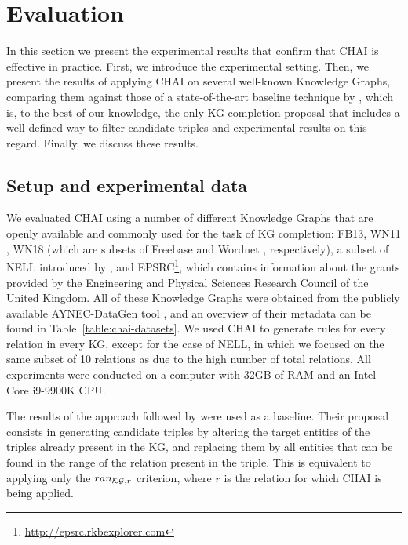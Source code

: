 \section{Evaluation}\label{sec:chai-evaluation}
In this section we present the experimental results that confirm that CHAI is effective in practice. First, we introduce the experimental setting. Then, we present the results of applying CHAI on several well-known Knowledge Graphs, comparing them against those of a state-of-the-art baseline technique by \citet{shi18}, which is, to the best of our knowledge, the only KG completion proposal that includes a well-defined way to filter candidate triples and experimental results on this regard. Finally, we discuss these results.

\subsection{Setup and experimental data}

We evaluated CHAI using a number of different Knowledge Graphs that are openly available and commonly used for the task of KG completion: FB13, WN11 \cite{socher2013}, WN18 \cite{bordes2014} (which are subsets of Freebase \cite{bollacker2008} and Wordnet \cite{miller1995}, respectively), a subset of NELL introduced by \citet{gardner2015}, and EPSRC\footnote{\url{http://epsrc.rkbexplorer.com}}, which contains information about the grants provided by the Engineering and Physical Sciences Research Council of the United Kingdom. All of these Knowledge Graphs were obtained from the publicly available AYNEC-DataGen tool \cite{ayala2019}, and an overview of their metadata can be found in Table~\ref{table:chai-datasets}. We used CHAI to generate rules for every relation in every KG, except for the case of NELL, in which we focused on the same subset of 10 relations as \citet{gardner2015} due to the high number of total relations. All experiments were conducted on a computer with 32GB of RAM and an Intel Core i9-9900K CPU.



The results of the approach followed by \citet{shi18} were used as a baseline. Their proposal consists in generating candidate triples by altering the target entities of the triples already present in the KG, and replacing them by all entities that can be found in the range of the relation present in the triple. This is equivalent to applying only the $ran_{\textmd{\textup{\ensuremath{\mathcal{K}}\ensuremath{\mathcal{G}}}}, r}$ criterion, where $r$ is the relation for which CHAI is being applied. %

